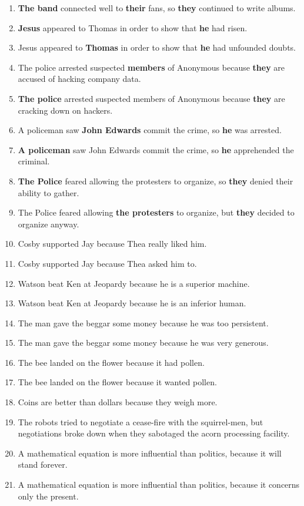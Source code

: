 \documentclass{article}
\begin{document}
\begin{enumerate}
	\item {\bf The band} connected well to {\bf their} fans, so {\bf they} continued to write albums.
	\item {\bf Jesus} appeared to Thomas in order to show that {\bf he} had risen.
	\item Jesus appeared to {\bf Thomas} in order to show that {\bf he} had unfounded doubts.
	\item The police arrested suspected {\bf members} of Anonymous because {\bf they} are accused of hacking company data.
	\item {\bf The police} arrested suspected members of Anonymous because {\bf they} are cracking down on hackers.
	\item A policeman saw {\bf John Edwards} commit the crime, so {\bf he} was arrested.
	\item {\bf A policeman} saw John Edwards commit the crime, so {\bf he} apprehended the criminal.
	\item {\bf The Police} feared allowing the protesters to organize, so {\bf they} denied their ability to gather.
	\item The Police feared allowing {\bf the protesters} to organize, but {\bf they} decided to organize anyway.
	\item Cosby supported Jay because Thea really liked him.
	\item Cosby supported Jay because Thea asked him to.
	\item Watson beat Ken at Jeopardy because he is a superior machine.
	\item Watson beat Ken at Jeopardy because he is an inferior human.
	\item The man gave the beggar some money because he was too persistent.
	\item The man gave the beggar some money because he was very generous.
	\item The bee landed on the flower because it had pollen.
	\item The bee landed on the flower because it wanted pollen.
	\item Coins are better than dollars because they weigh more.
	\item The robots tried to negotiate a cease-fire with the squirrel-men, but negotiations broke down when they sabotaged the acorn processing facility.
	\item A mathematical equation is more influential than politics, because it will stand forever.
	\item A mathematical equation is more influential than politics, because it concerns only the present.

\end{enumerate}
\end{document}
